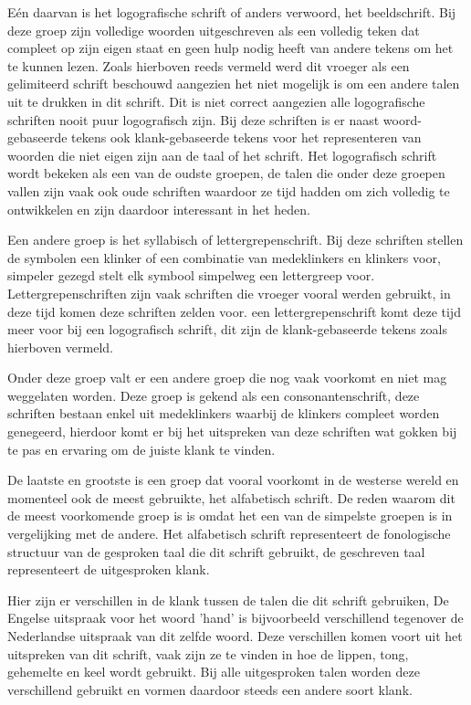 Eén daarvan is het logografische schrift of anders verwoord, het beeldschrift.
Bij deze groep zijn volledige woorden uitgeschreven als een volledig teken dat compleet op zijn eigen staat en geen hulp nodig heeft van andere tekens om het te kunnen lezen.
Zoals hierboven reeds vermeld werd dit vroeger als een gelimiteerd schrift beschouwd aangezien het niet mogelijk is om een andere talen uit te drukken in dit schrift.
Dit is niet correct aangezien alle logografische schriften nooit puur logografisch zijn. Bij deze schriften is er naast woord-gebaseerde tekens ook klank-gebaseerde tekens voor het representeren van woorden die niet eigen zijn aan de taal of het schrift.
Het logografisch schrift wordt bekeken als een van de oudste groepen, de talen die onder deze groepen vallen zijn vaak ook oude schriften waardoor ze tijd hadden om zich volledig te ontwikkelen en zijn daardoor interessant in het heden.

Een andere groep is het syllabisch of lettergrepenschrift.
Bij deze schriften stellen de symbolen een klinker of een combinatie van medeklinkers en klinkers voor, simpeler gezegd stelt elk symbool simpelweg een lettergreep voor.
Lettergrepenschriften zijn vaak schriften die vroeger vooral werden gebruikt, in deze tijd komen deze schriften zelden voor.
een lettergrepenschrift komt deze tijd meer voor bij een logografisch schrift, dit zijn de klank-gebaseerde tekens zoals hierboven vermeld.

Onder deze groep valt er een andere groep die nog vaak voorkomt en niet mag weggelaten worden.
Deze groep is gekend als een consonantenschrift, deze schriften bestaan enkel uit medeklinkers waarbij de klinkers compleet worden genegeerd, hierdoor komt er bij het uitspreken van deze schriften wat gokken bij te pas en ervaring om de juiste klank te vinden.


De laatste en grootste is een groep dat vooral voorkomt in de westerse wereld en momenteel ook de meest gebruikte, het alfabetisch schrift.
De reden waarom dit de meest voorkomende groep is is omdat het een van de simpelste groepen is in vergelijking met de andere.
Het alfabetisch schrift representeert de fonologische structuur van de gesproken taal die dit schrift gebruikt, de geschreven taal representeert de uitgesproken klank.

Hier zijn er verschillen in de klank tussen de talen die dit schrift gebruiken, De Engelse uitspraak voor het woord 'hand' is bijvoorbeeld verschillend tegenover de Nederlandse uitspraak van dit zelfde woord.
Deze verschillen komen voort uit het uitspreken van dit schrift, vaak zijn ze te vinden in hoe de lippen, tong, gehemelte en keel wordt gebruikt. Bij alle uitgesproken talen worden deze verschillend gebruikt en vormen daardoor steeds een andere soort klank. 

